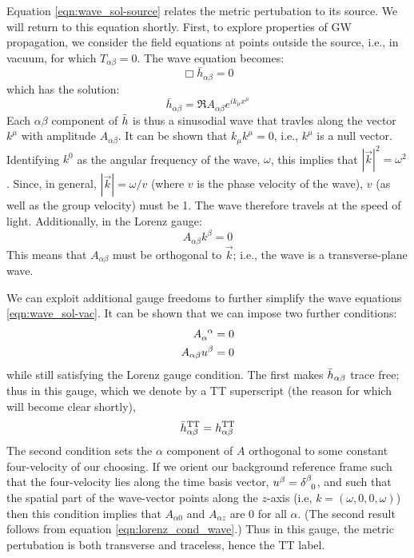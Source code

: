 Equation \ref{eqn:wave_sol-source} relates the metric pertubation to its source. We will return to this equation shortly. First, to explore properties of \ac{GW} propagation, we consider the field equations at points outside the source, i.e., in vacuum, for which $T_{\alpha\beta} = 0$. The wave equation becomes:
\begin{equation}
\Box\bar{h}_{\alpha\beta} = 0
\end{equation}
which has the solution:
\begin{equation}
\label{eqn:wave_sol-vac}
\bar{h}_{\alpha\beta} = \Re A_{\alpha\beta} e^{ik_\mu x^\mu}
\end{equation}
Each $\alpha\beta$ component of $\Bar{h}$ is thus a sinusodial wave that travles along the vector $k^\mu$ with amplitude $A_{\alpha\beta}$. It can be shown \cite{ref:Schutz} that $k_\mu k^\mu = 0$, i.e., $k^\mu$ is a null vector. Identifying $k^0$ as the angular frequency of the wave, $\omega$, this implies that  $|\vec{k}|^2 = \omega^2$. Since, in general, $|\vec{k}| = \omega/v$ (where $v$ is the phase velocity of the wave), $v$ (as well as the group velocity) must be 1. The wave therefore travels at the speed of light. Additionally, in the Lorenz gauge:
\begin{equation}
\label{eqn:lorenz_cond_wave}
A_{\alpha\beta}k^\beta = 0
\end{equation}
This means that $A_{\alpha\beta}$ must be orthogonal to $\vec{k}$; i.e., the wave is a transverse-plane wave.

We can exploit additional gauge freedoms to further simplify the wave equations \ref{eqn:wave_sol-vac}. It can be shown \cite{ref:Schutz} that we can impose two further conditions:
\begin{align}
A\indices{_{\alpha}^{\alpha}} = 0 \\
A_{\alpha\beta}u^{\beta} = 0
\end{align}
while still satisfying the Lorenz gauge condition. The first makes $\Bar{h}_{\alpha\beta}$ trace free; thus in this gauge, which we denote by a TT superscript (the reason for which will become clear shortly),
\begin{equation}
\Bar{h}^{\mathrm{TT}}_{\alpha\beta} = h^{\mathrm{TT}}_{\alpha\beta}
\end{equation}
The second condition sets the $\alpha$ component of $A$ orthogonal to some constant four-velocity of our choosing. If we orient our background reference frame such that the four-velocity lies along the time basis vector, $u^\beta = \delta\indices{^{\beta}_0}$, and such that the spatial part of the wave-vector points along the $z$-axis (i.e, $k = (\omega,0,0,\omega)$) then this condition implies that $A_{\alpha0}$ and $A_{\alpha z}$ are $0$ for all $\alpha$. (The second result follows from equation \ref{eqn:lorenz_cond_wave}.) Thus in this gauge, the metric pertubation is both transverse and traceless, hence the TT label.

